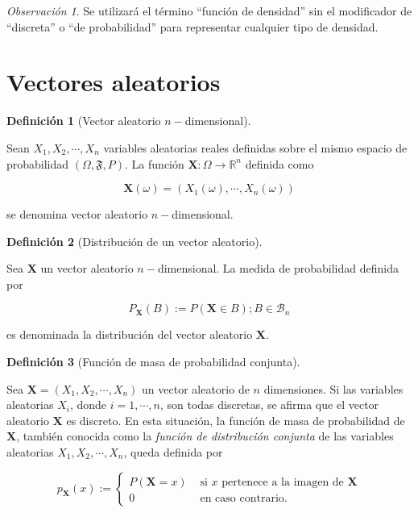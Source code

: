 \documentclass[
  letterpaper,
  DIV=11,
  numbers=noendperiod]{scrreport}
\theoremstyle{plain}
\theoremstyle{definition}
\newtheorem{definition}{Definición}[chapter]
\theoremstyle{definition}
\theoremstyle{plain}
\theoremstyle{remark}
\newtheorem*{remark}{Observación}
\begin{document}
\begin{remark}
Se utilizará el término ``función de densidad'' sin el modificador de
``discreta'' o ``de probabilidad'' para representar cualquier tipo de
densidad.
\end{remark}

\section{Vectores aleatorios}\label{vectores-aleatorios}

\begin{definition}[Vector aleatorio
\(n-\)dimensional]\protect\hypertarget{def-randvec}{}\label{def-randvec}

Sean \(X_1,X_2,\cdots, X_n\) variables aleatorias reales definidas sobre
el mismo espacio de probabilidad \((\Omega, \mathfrak F, P)\). La
función \(\mathbf X:\Omega\to\mathbb R^n\) definida como

\[ \mathbf X(\omega)= (X_1(\omega),\cdots,X_n(\omega)) \]

se denomina vector aleatorio \(n-\)dimensional.

\end{definition}

\begin{definition}[Distribución de un vector
aleatorio]\protect\hypertarget{def-drv}{}\label{def-drv}

Sea \(\mathbf X\) un vector aleatorio \(n-\)dimensional. La medida de
probabilidad definida por

\[ P_{\mathbf X} (B) := P(\mathbf X\in B); B\in \mathcal B_n \]

es denominada la distribución del vector aleatorio \(\mathbf X\).

\end{definition}

\begin{definition}[Función de masa de probabilidad
conjunta]\protect\hypertarget{def-dcva}{}\label{def-dcva}

Sea \(\mathbf X= (X_1,X_2,\cdots,X_n)\) un vector aleatorio de \(n\)
dimensiones. Si las variables aleatorias \(X_i\), donde
\(i=1,\cdots,n\), son todas discretas, se afirma que el vector aleatorio
\(\mathbf X\) es discreto. En esta situación, la función de masa de
probabilidad de \(\mathbf X\), también conocida como la \emph{función de
distribución conjunta} de las variables aleatorias
\(X_1, X_2, \cdots, X_n\), queda definida por

\[ p_\mathbf{X}(x):=\begin{cases}P(\mathbf X=x) & \text{ si } x \text{  pertenece a la imagen de } \mathbf X\\ 0 & \text{ en caso contrario. } \end{cases} \]

\end{definition}
\end{document}
